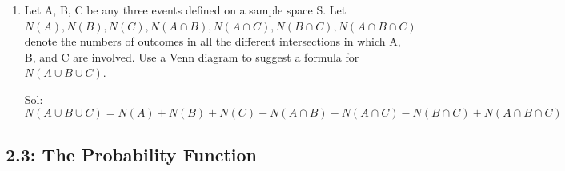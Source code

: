 \begin{enumerate}
    \underline{Sol}:
    \[
      \begin{aligned}
        F &= \lbrace A, E, I, L \rbrace \\
        R &= \lbrace E, I, L, S, T \rbrace \\
        V &= \lbrace A, E, I, O \rbrace
      \end{aligned}
    \]
    \begin{enumerate}
      \item \(F \cap R \cap V = \boxed{\lbrace E, I \rbrace}\)

      \item \(F^C \cap R \cap V^C = \boxed{\lbrace S, T \rbrace}\)

      \item \(F \cap R^C \cap V = \boxed{\lbrace A \rbrace}\)
    \end{enumerate}

  \item[38.] Let A, B, C be any three events defined on a sample
    space S. Let \(N(A), N(B), N(C), N(A \cap B), N(A \cap C), N(B
    \cap C), N(A \cap B \cap C)\) denote the numbers of outcomes in
    all the different intersections in which A, B, and C are
    involved. Use a Venn diagram to suggest a formula for \(N(A \cup
    B \cup C)\).

    \underline{Sol}:
    \[
      N(A \cup B \cup C) = \boxed{N(A) + N(B) + N(C) - N(A \cap B) -
      N(A \cap C) - N(B \cap C) + N(A \cap B \cap C)}
    \]
\end{enumerate}

\subsection*{2.3: The Probability Function}

